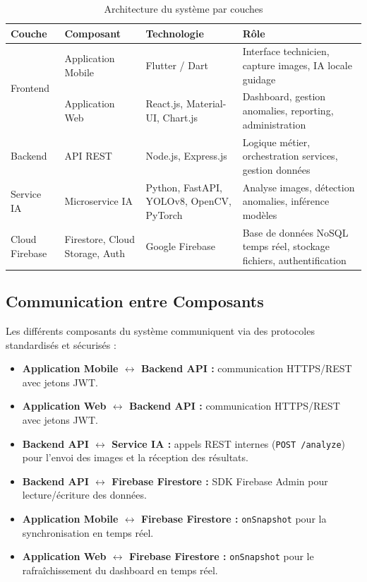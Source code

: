 \begin{table}[H]
\centering
\caption{Architecture du système par couches}
\label{tab:architecture}
\renewcommand{\arraystretch}{1.4}
\begin{tabularx}{\textwidth}{|l|l|l|X|}
\hline
\textbf{Couche} & \textbf{Composant} & \textbf{Technologie} & \textbf{Rôle} \\
\hline
\multirow{2}{*}{Frontend}
  & Application Mobile  & Flutter / Dart
  & Interface technicien, capture images, IA locale guidage \\
\cline{2-4}
  & Application Web     & React.js, Material-UI, Chart.js
  & Dashboard, gestion anomalies, reporting, administration \\
\hline
Backend
  & API REST            & Node.js, Express.js
  & Logique métier, orchestration services, gestion données \\
\hline
Service IA
  & Microservice IA     & Python, FastAPI, YOLOv8, OpenCV, PyTorch
  & Analyse images, détection anomalies, inférence modèles \\
\hline
Cloud Firebase
  & Firestore, Cloud Storage, Auth & Google Firebase
  & Base de données NoSQL temps réel, stockage fichiers, authentification \\
\hline
\end{tabularx}
\end{table}

\subsection{Communication entre Composants}

Les différents composants du système communiquent via des protocoles standardisés et sécurisés :

\begin{itemize}
    \item \textbf{Application Mobile $\leftrightarrow$ Backend API :} communication HTTPS/REST avec jetons JWT.
    \item \textbf{Application Web $\leftrightarrow$ Backend API :} communication HTTPS/REST avec jetons JWT.
    \item \textbf{Backend API $\leftrightarrow$ Service IA :} appels REST internes (\texttt{POST /analyze}) pour l'envoi des images et la réception des résultats.
    \item \textbf{Backend API $\leftrightarrow$ Firebase Firestore :} SDK Firebase Admin pour lecture/écriture des données.
    \item \textbf{Application Mobile $\leftrightarrow$ Firebase Firestore :} \texttt{onSnapshot} pour la synchronisation en temps réel.
    \item \textbf{Application Web $\leftrightarrow$ Firebase Firestore :} \texttt{onSnapshot} pour le rafraîchissement du dashboard en temps réel.
\end{itemize}

